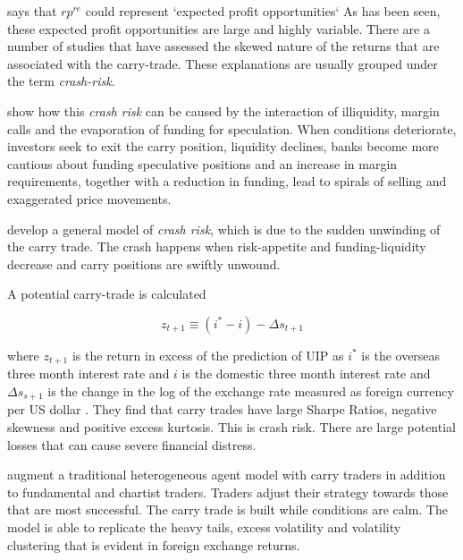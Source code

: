 \documentclass[12pt, a4paper, oneside]{article}\usepackage[]{graphicx}\usepackage[]{color}
\begin{document}
\citet[p.148]{Engel1996} says that $rp^{re}$ could represent `expected profit opportunities` As has been seen, these expected profit opportunities are large and highly variable.  There are a number of studies that have assessed the skewed nature of the returns that are associated with the carry-trade.  These explanations are usually grouped under the term \emph{crash-risk}.  

\citet{BrunnermeierLiquidity} show how this \emph{crash risk} can be caused by the interaction of illiquidity, margin calls and the evaporation of funding for speculation.  When conditions deteriorate, investors seek to exit the carry position, liquidity declines, banks become more cautious about funding speculative positions and an increase in margin requirements, together with a reduction in funding, lead to spirals of selling and exaggerated price movements.

\citet{BrunnermeierCarry} develop a general model of \emph{crash risk}, which is due to the sudden unwinding of the carry trade.  The crash happens when risk-appetite and funding-liquidity decrease and carry positions are swiftly unwound. 

A potential carry-trade is calculated 

\begin{equation}\label{eqref:carry}
z_{t+1} \equiv (i^* - i) -\Delta s_{t+1}
\end{equation}

where $z_{t+1}$ is the return in excess of the prediction of UIP as $i^*$ is the overseas three  month interest rate and $i$ is the domestic three month interest rate and $\Delta s_{s+1}$ is the change in the log of the exchange rate measured as foreign currency per US dollar \citet[pp. 8-9]{BrunnermeierCarry}.   They find that carry trades have large Sharpe Ratios, negative skewness and positive excess kurtosis. This is crash risk. There are large potential losses that can cause severe financial distress. 

 \citet{SpronkEER} augment a traditional heterogeneous agent model with carry traders in addition to fundamental and chartist traders.  Traders adjust their strategy towards those that are most successful. The carry trade is built while conditions are calm.    The model is able to replicate the heavy tails, excess volatility and volatility clustering that is evident in foreign exchange returns.  
\end{document}

